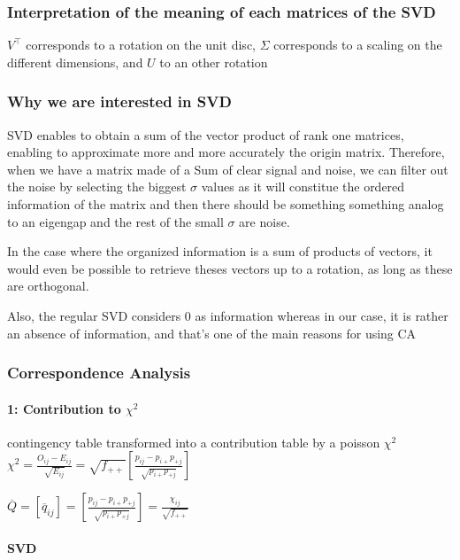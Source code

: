 \documentclass{article}
\begin{document}
\subsubsection{Interpretation of the meaning of each matrices of the SVD}

$V^\intercal$ corresponds to a rotation on the unit disc, $\Sigma$ corresponds to a  scaling on the different dimensions, and $U$ to an other rotation 

\subsubsection{Why we are interested in SVD}

SVD enables to obtain a sum of the vector product of rank one matrices, enabling to approximate more and more accurately the origin matrix. Therefore, when we have a matrix made of a Sum of clear signal and noise, we can filter out the noise by selecting the biggest $\sigma$ values as it will constitue the ordered information of the matrix and then there should be something something analog to an eigengap and the rest of the small $\sigma$ are noise.

In the case where the organized information is a sum of products of vectors, it would even be possible to retrieve theses vectors up to a rotation, as long as these are orthogonal.

Also, the regular SVD considers 0 as information whereas in our case, it is rather an absence of information, and that's one of the main reasons for using CA

\subsubsection{Correspondence Analysis}

\paragraph{1: Contribution to $\chi^2$}

contingency table transformed into a contribution table by a poisson $\chi^2$ 
$\chi^2 = \frac{O_{ij} -  E_{ij}}{\sqrt{E_{ij}}} = \sqrt{f_{++}}[\frac{p_{ij} - p_{i+}p_{+j}}{\sqrt{p_{i+}p_{+j}}}]$

$\overline{Q} = [\overline{q}_{ij}] = [\frac{p_{ij} - p_{i+}p_{+j}}{\sqrt{p_{i+}p_{+j}}}] = \frac{\chi_{ij}}{\sqrt{f_{++}}}$

\paragraph{SVD}
\end{document}
